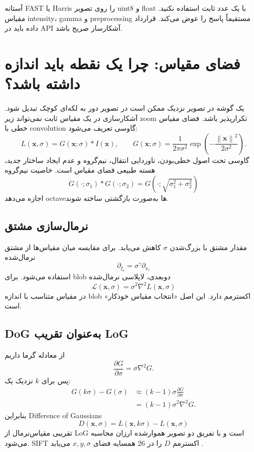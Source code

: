 \documentclass[12pt,openany,oneside]{book}
\newcommand{\norm}[1]{\left\lVert #1\right\rVert}
\newcommand{\vect}[1]{\bm{#1}}
\begin{document}
\begin{warningbox}
آستانه FAST یا Harris را روی تصویر uint8 و float با یک عدد ثابت استفاده نکنید. مقیاس intensity، gamma و preprocessing
مستقیماً پاسخ را عوض می‌کند. قرارداد داده باید در API آشکارساز صریح باشد.
\end{warningbox}

\section{فضای مقیاس: چرا یک نقطه باید اندازه داشته باشد؟}
یک گوشه در تصویر نزدیک ممکن است در تصویر دور به لکه‌ای کوچک تبدیل شود. آشکارسازی در یک مقیاس ثابت نمی‌تواند زیر zoom تکرارپذیر باشد.
فضای مقیاس خطی با convolution گاوسی تعریف می‌شود:
\begin{equation}
L(\vect x,\sigma)=G(\vect x;\sigma)*I(\vect x),\qquad
G(\vect x;\sigma)=\frac{1}{2\pi\sigma^2}
\exp\!\left(-\frac{\norm{\vect x}^2}{2\sigma^2}\right).
\label{eq:scale_space}
\end{equation}
گاوسی تحت اصول خطی‌بودن، ناوردایی انتقال، نیم‌گروه و عدم ایجاد ساختار جدید، هسته طبیعی فضای مقیاس است.
خاصیت نیم‌گروه
\begin{equation}
G(\cdot;\sigma_1)*G(\cdot;\sigma_2)=
G\!\left(\cdot;\sqrt{\sigma_1^2+\sigma_2^2}\right)
\end{equation}
اجازه می‌دهد octaveها به‌صورت بازگشتی ساخته شوند.

\subsection{نرمال‌سازی مشتق}
مقدار مشتق با بزرگ‌شدن $\sigma$ کاهش می‌یابد. برای مقایسه میان مقیاس‌ها از مشتق نرمال‌شده
\begin{equation}
\partial_{\xi_i}=\sigma^\gamma\partial_{x_i}
\end{equation}
استفاده می‌شود. برای blob دوبعدی، لاپلاسی نرمال‌شده
\begin{equation}
\mathcal L(\vect x,\sigma)=\sigma^2\nabla^2L(\vect x,\sigma)
\label{eq:norm_log}
\end{equation}
در مقیاس متناسب با اندازه blob اکسترمم دارد. این اصل «انتخاب مقیاس خودکار» است.

\subsection{DoG به‌عنوان تقریب LoG}
از معادله گرما داریم
\begin{equation}
\frac{\partial G}{\partial \sigma}=\sigma\nabla^2G.
\end{equation}
پس برای $k$ نزدیک یک:
\begin{align}
G(k\sigma)-G(\sigma)
&\approx (k-1)\sigma\frac{\partial G}{\partial\sigma}\\
&=(k-1)\sigma^2\nabla^2G.
\end{align}
بنابراین Difference of Gaussians
\begin{equation}
D(\vect x,\sigma)=L(\vect x,k\sigma)-L(\vect x,\sigma)
\end{equation}
تقریبی مقیاس‌نرمال از LoG است و با تفریق دو تصویر هموارشده ارزان محاسبه می‌شود. SIFT اکسترمم $D$ را در 26 همسایه فضای
$x,y,\sigma$ می‌یابد \cite{lowe2004}.
\end{document}
